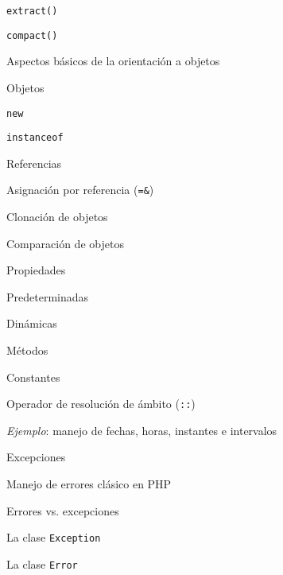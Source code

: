 \begin{longenum}
\begin{longenum}
        \begin{longenum}
            \item \texttt{extract()}
            \item \texttt{compact()}
        \end{longenum}
        \item Aspectos básicos de la orientación a objetos
        \begin{longenum}
            \item Objetos
            \begin{longenum}
                \item \texttt{new}
                \item \texttt{instanceof}
            \end{longenum}
            \item Referencias
            \begin{longenum}
                \item Asignación por referencia (\texttt{=\&})
            \end{longenum}
            \item Clonación de objetos
            \item Comparación de objetos
            \item Propiedades
            \begin{longenum}
                \item Predeterminadas
                \item Dinámicas
            \end{longenum}
            \item Métodos
            \item Constantes
            \begin{longenum}
                \item Operador de resolución de ámbito (\texttt{::})
            \end{longenum}
            \item \textit{Ejemplo}: manejo de fechas, horas, instantes e intervalos
        \end{longenum}
        \item Excepciones
        \begin{longenum}
            \item Manejo de errores clásico en PHP
            \item Errores vs. excepciones
            \item La clase \texttt{Exception}
            \item La clase \texttt{Error}

\end{longenum}
\end{longenum}
\end{longenum}
